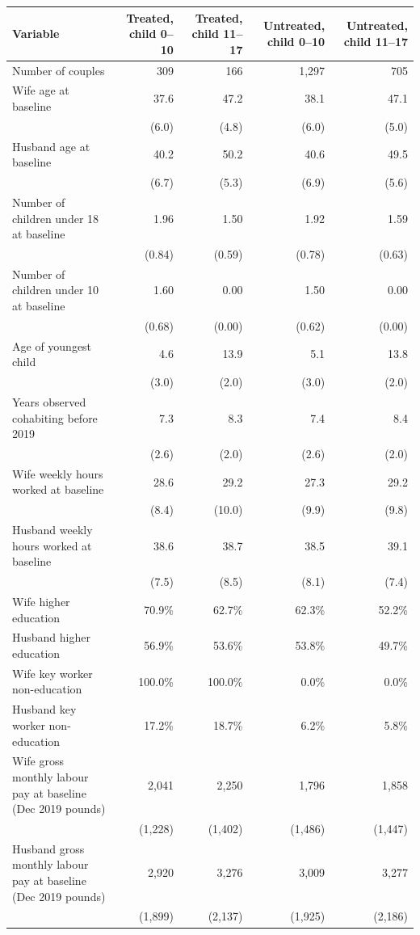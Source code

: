 
\begin{tabular}{lrrrr}
\toprule
Variable & Treated, child 0--10 & Treated, child 11--17 & Untreated, child 0--10 & Untreated, child 11--17\\
\midrule
Number of couples & 309 & 166 & 1,297 & 705\\
Wife age at baseline & 37.6 & 47.2 & 38.1 & 47.1\\
 & (6.0) & (4.8) & (6.0) & (5.0)\\
Husband age at baseline & 40.2 & 50.2 & 40.6 & 49.5\\
 & (6.7) & (5.3) & (6.9) & (5.6)\\
Number of children under 18 at baseline & 1.96 & 1.50 & 1.92 & 1.59\\
 & (0.84) & (0.59) & (0.78) & (0.63)\\
Number of children under 10 at baseline & 1.60 & 0.00 & 1.50 & 0.00\\
 & (0.68) & (0.00) & (0.62) & (0.00)\\
Age of youngest child & 4.6 & 13.9 & 5.1 & 13.8\\
 & (3.0) & (2.0) & (3.0) & (2.0)\\
Years observed cohabiting before 2019 & 7.3 & 8.3 & 7.4 & 8.4\\
 & (2.6) & (2.0) & (2.6) & (2.0)\\
Wife weekly hours worked at baseline & 28.6 & 29.2 & 27.3 & 29.2\\
 & (8.4) & (10.0) & (9.9) & (9.8)\\
Husband weekly hours worked at baseline & 38.6 & 38.7 & 38.5 & 39.1\\
 & (7.5) & (8.5) & (8.1) & (7.4)\\
Wife higher education & 70.9\% & 62.7\% & 62.3\% & 52.2\%\\
Husband higher education & 56.9\% & 53.6\% & 53.8\% & 49.7\%\\
Wife key worker non-education & 100.0\% & 100.0\% & 0.0\% & 0.0\%\\
Husband key worker non-education & 17.2\% & 18.7\% & 6.2\% & 5.8\%\\
Wife gross monthly labour pay at baseline (Dec 2019 pounds) & 2,041 & 2,250 & 1,796 & 1,858\\
 & (1,228) & (1,402) & (1,486) & (1,447)\\
Husband gross monthly labour pay at baseline (Dec 2019 pounds) & 2,920 & 3,276 & 3,009 & 3,277\\
 & (1,899) & (2,137) & (1,925) & (2,186)\\
\bottomrule
\end{tabular}
